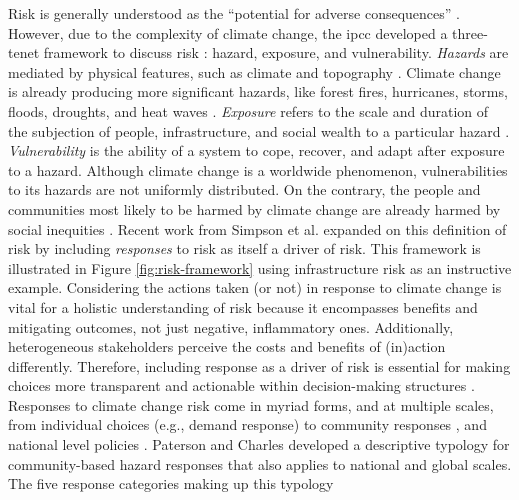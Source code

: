 Risk is generally understood as the ``potential for adverse consequences''
\cite{reisinger_concept_2020}. However, due to the complexity of climate change,
the \ac{ipcc} developed a three-tenet framework to discuss risk
\cite{reisinger_concept_2020}: hazard, exposure, and vulnerability.
\textit{Hazards} are mediated by physical features, such as climate and
topography \cite{dorkenoo_critical_2022, simpson_framework_2021}.  Climate
change is already producing more significant hazards, like forest fires, hurricanes,
storms, floods, droughts, and heat waves \cite{reidmiller_fourth_2018,
intergovernmental_panel_on_climate_change_climate_2021, dahl_killer_2019}.
\textit{Exposure} refers to the scale and duration of the subjection of people,
infrastructure, and social wealth to a particular hazard
\cite{simpson_framework_2021,reisinger_concept_2020,li_understanding_2021}.
\textit{Vulnerability} is the ability of a system to cope, recover, and adapt
after exposure to a hazard. Although climate change is a worldwide phenomenon,
vulnerabilities to its hazards are not uniformly distributed. On the contrary, 
the people and communities most likely to be harmed by climate change are already 
harmed by social inequities \cite{islam_climate_2017}. Recent work
from Simpson et al. \cite{simpson_framework_2021} expanded on this definition of
risk by including \textit{responses} to risk as itself a driver of risk. This
framework is illustrated in Figure \ref{fig:risk-framework} using infrastructure risk 
as an instructive example. Considering the
actions taken (or not) in response to climate change is vital for a holistic
understanding of risk because it encompasses benefits and mitigating outcomes,
not just negative, inflammatory ones. Additionally, heterogeneous stakeholders
perceive the costs and benefits of (in)action differently. Therefore,
including response as a driver of risk is essential for making choices more
transparent and actionable within decision-making structures
\cite{simpson_framework_2021}. Responses to climate change risk come in myriad
forms,  and at multiple scales, from individual choices (e.g., demand response)
\cite{seck_embedding_2020,rinaldi_what_2022, dehghanpour_agent-based_2018} to
community responses \cite{paterson_community-based_2019, elmallah_frontlining_2022}, 
and national level policies \cite{roelfsema_taking_2020, fawzy_strategies_2020}.
Paterson and Charles \cite{paterson_community-based_2019} developed a
descriptive typology for community-based hazard responses that also applies to
national and global scales. The five response categories making up this typology
